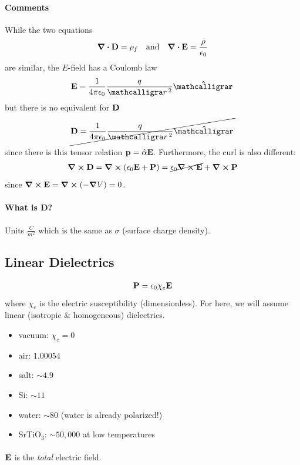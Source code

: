 \documentclass[../main.tex]{subfiles}
\begin{document}
\paragraph{Comments} While the two equations
\begin{align*}
    \div \vb D = \rho_f \qand \div \vb E = \frac{\rho}{\epsilon_0}
\end{align*}
are similar, the $E$-field has a Coulomb law 
\begin{align*}
    \vb E = \ke \frac{q}{\scriptr^2} \vu \scriptr
\end{align*}
but there is no equivalent for $\vb D$
\begin{align*}
    \cancel{\vb D = \ke \frac{q}{\scriptr^2} \vu \scriptr}
\end{align*}
since there is this tensor relation $\vb p = \hat \alpha \vb E$.
Furthermore, the curl is also different:
\begin{align*}
    \curl \vb D = \curl (\epsilon_0 \vb E + \vb P) = \cancel{\epsilon_0 \curl \vb E} + \curl \vb P
\end{align*}
since $\curl \vb E = \curl (-\grad V) = 0$.

\paragraph{What is D?} Units $\si{\frac{C}{m^2}}$ which is the same as $\sigma$ (surface charge density).

\subsection{Linear Dielectrics}
\begin{align*}
    \vb P = \epsilon_0 \chi_e \vb E
\end{align*}
where $\chi_e$ is the electric susceptibility (dimensionless). For here, we will assume linear (isotropic \& homogeneous) dielectrics.
\begin{itemize}
    \item vacuum: $\chi_e = 0$
    \item air: $1.00054$
    \item salt: $\sim 4.9$
    \item Si: $\sim 11$
    \item water: $\sim 80$ (water is already polarized!)
    \item SrTiO$_3$: $\sim 50,000$ at low temperatures
\end{itemize}
\paragraph{}
$\vb E$ is the \textit{total} electric field.
\end{document}
